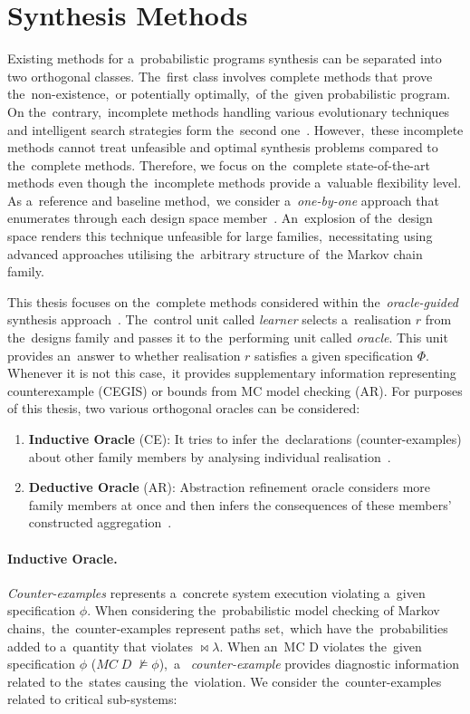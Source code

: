 \section{Synthesis Methods}
Existing methods for a~probabilistic programs synthesis can be separated into two orthogonal classes.
The~first class involves complete methods that prove the~non-existence,~or potentially optimally,~of the~given probabilistic program.
On the~contrary,~incomplete methods handling various evolutionary techniques and intelligent search strategies form the~second one~\cite{spl2}.
However,~these incomplete methods cannot treat unfeasible and optimal synthesis problems compared to the~complete methods.
Therefore, we focus on the~complete state-of-the-art methods even though the~incomplete methods provide a~valuable flexibility level.
As a~reference and baseline method,~we consider a~\textit{one-by-one} approach that enumerates through each design space member~\cite{onebyone}.
An~explosion of the~design space renders this technique unfeasible for large families,~necessitating using advanced approaches utilising the~arbitrary structure of~the Markov chain family.

This thesis focuses on the~complete methods considered within the~\textit{oracle-guided} synthesis approach~\cite{oracle1,oracle2}.
The~control unit called \textit{learner} selects a~realisation $r$ from the~designs family and passes it to the~performing unit called \textit{oracle}.
This unit provides an~answer to whether realisation $r$ satisfies a given specification $\varPhi$.
Whenever it is not this case,~it provides supplementary information representing counterexample (CEGIS) or bounds from MC model checking (AR).
For purposes of this thesis, two various orthogonal oracles can be considered:
\begin{enumerate}[label=(\roman*)]
    \item \textbf{Inductive Oracle} (CE): It tries to infer the~declarations (counter-examples) about other family members by analysing individual realisation~\cite{cegis}.
    \item \textbf{Deductive Oracle} (AR): Abstraction refinement oracle considers more family members at once and then infers the consequences of these members' constructed aggregation~\cite{cegar}.
\end{enumerate}

\paragraph{Inductive Oracle.}
\textit{Counter-examples} represents a~concrete system execution violating a~given specification $\phi$.
When considering the~probabilistic model checking of Markov chains,~the~counter-examples represent paths set,~which have the~probabilities added to a~quantity that violates $\bowtie \lambda$.
When an~MC D violates the~given specification $\phi$ ($MC \; D \; \not\models \phi$),~a~ \textit{counter-example} provides diagnostic information related to the~states causing the~violation.
We consider the~counter-examples related to critical sub-systems:

